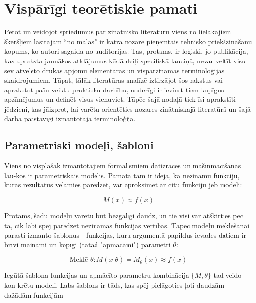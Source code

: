 \documentclass[12pt, a4paper]{article}
\numberwithin{equation}{section} %
\begin{document}
%
%
%
%
%
%
%
%
%
%
%
%
%
%
%
%
%
%
%

\newpage
\section{Vispārīgi teorētiskie pamati}

Pētot un veidojot spriedumus par zinātnisko literatūru viens no lielākajiem šķēršļiem lasītājam ``no malas'' ir katrā nozarē pieņemtais tehnisko priekšzināšanu kopums, ko autori sagaida no auditorijas. Tas, protams, ir loģiski, jo publikācija, kas apraksta jaunākos atklājumus kādā dziļi specifiskā lauciņā, nevar veltīt visu sev atvēlēto drukas apjomu elementāras un vispārzināmas terminoloģijas skaidrojumiem. Tāpat, tālāk literatūras analīzē iztirzājot šos rakstus vai aprakstot pašu veiktu praktisku darbību, noderīgi ir ieviest tiem kopīgus apzīmējumus un definēt visus vienuviet. Tāpēc šajā nodaļā tiek īsi aprakstīti jēdzieni, kas jāizprot, lai varētu orientēties nozares zinātniskajā literatūrā un šajā darbā patstāvīgi izmantotajā terminoloģijā.

\subsection{Parametriski modeļi, šabloni}

Viens no visplašāk izmantotajiem formālismiem datizraces un mašīnmācīšanās lau-kos ir parametriskais modelis. Pamatā tam ir ideja, ka nezināmu funkciju, kuras rezultātus vēlamies paredzēt, var aproksimēt ar citu funkciju jeb modeli:

\begin{equation} 
    M(x) \approx f(x)
\end{equation}

Protams, šādu modeļu varētu būt bezgalīgi daudz, un tie visi var atšķirties pēc tā, cik labi spēj paredzēt nezināmās funkcijas vērtības. Tāpēc modeļu meklēšanai parasti izmanto šablonus - funkcijas, kuru argumentā papildus ievades datiem ir brīvi maināmi un kopīgi (tātad "apmācāmi") parametri $\theta$:

\begin{equation} 
    \text{Meklē } \theta:M(x \vert \theta) = M_{\theta}(x)  \approx f(x)
\end{equation}

Iegūtā šablona funkcijas un apmācīto parametru kombinācija $\lbrace M, \theta \rbrace$ tad veido kon-krētu modeli. Labs šablons ir tāds, kas spēj pielāgoties ļoti daudzām dažādām funkcijām:
\end{document}
